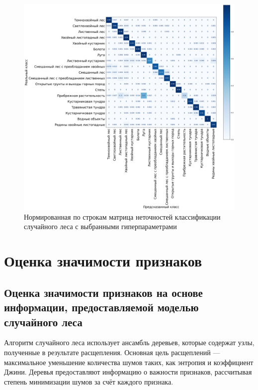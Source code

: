 \documentclass[14pt, a4paper, oneside]{extarticle}
\begin{document}
\begin{figure}[H]
    \caption{Нормированная по строкам матрица неточностей классификации случайного леса с выбранными гиперпараметрами}
    \centering
    \includegraphics[scale=0.33]{confusion-matrix-4}
\end{figure}
\newpage

\section{Оценка значимости признаков}
\subsection{Оценка значимости признаков на основе информации, предоставляемой моделью случайного леса}
Алгоритм случайного леса использует ансамбль деревьев, которые содержат узлы, полученные в результате расщепления. Основная цель расщеплений --- максимальное уменьшение количества шумов таких, как энтропия и коэффициент Джини. Деревья предоставляют информацию о важности признаков, рассчитывая степень минимизации шумов за счёт каждого признака.
\end{document}
